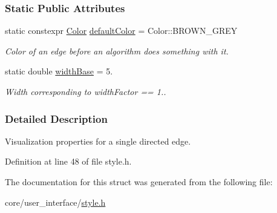 \subsubsection*{Static Public Attributes}
\begin{DoxyCompactItemize}
\item 
static constexpr \hyperlink{colors_8h_ab87bacfdad76e61b9412d7124be44c1c}{Color} \hyperlink{structEdgeStyle_ac7b5e5bda23384d1d341a61aa8d36357}{default\+Color} = Color\+::\+B\+R\+O\+W\+N\+\_\+\+G\+R\+EY\hypertarget{structEdgeStyle_ac7b5e5bda23384d1d341a61aa8d36357}{}\label{structEdgeStyle_ac7b5e5bda23384d1d341a61aa8d36357}

\begin{DoxyCompactList}\small\item\em Color of an edge before an algorithm does something with it. \end{DoxyCompactList}\item 
static double \hyperlink{structEdgeStyle_a88429c2d5f1b5dbc0caaa66ec2370355}{width\+Base} = 5.\hypertarget{structEdgeStyle_a88429c2d5f1b5dbc0caaa66ec2370355}{}\label{structEdgeStyle_a88429c2d5f1b5dbc0caaa66ec2370355}

\begin{DoxyCompactList}\small\item\em Width corresponding to width\+Factor == 1.. \end{DoxyCompactList}\end{DoxyCompactItemize}


\subsubsection{Detailed Description}
Visualization properties for a single directed edge. 

Definition at line 48 of file style.\+h.



The documentation for this struct was generated from the following file\+:\begin{DoxyCompactItemize}
\item 
core/user\+\_\+interface/\hyperlink{style_8h}{style.\+h}\end{DoxyCompactItemize}
